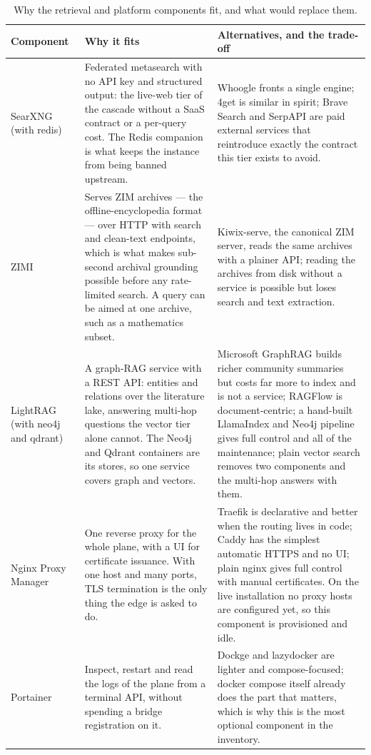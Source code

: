 \documentclass[10pt]{article}
\begin{document}
\begin{table}[htbp]
\centering\footnotesize
\caption{Why the retrieval and platform components fit, and what would replace them.}\label{tab:whyread}
\renewcommand{\arraystretch}{1.15}
\begin{tabularx}{\textwidth}{@{}>{\raggedright\arraybackslash}p{2.8cm} >{\raggedright\arraybackslash}X >{\raggedright\arraybackslash}X@{}}
\toprule
\textbf{Component} & \textbf{Why it fits} & \textbf{Alternatives, and the trade-off} \\
\midrule
SearXNG (with redis) & Federated metasearch with no API key and structured output: the live-web tier of the cascade without a SaaS contract or a per-query cost. The Redis companion is what keeps the instance from being banned upstream. & Whoogle fronts a single engine; 4get is similar in spirit; Brave Search and SerpAPI are paid external services that reintroduce exactly the contract this tier exists to avoid. \\
ZIMI & Serves ZIM archives --- the offline-encyclopedia format --- over HTTP with search and clean-text endpoints, which is what makes sub-second archival grounding possible before any rate-limited search. A query can be aimed at one archive, such as a mathematics subset. & Kiwix-serve, the canonical ZIM server, reads the same archives with a plainer API; reading the archives from disk without a service is possible but loses search and text extraction. \\
LightRAG (with neo4j and qdrant) & A graph-RAG service with a REST API: entities and relations over the literature lake, answering multi-hop questions the vector tier alone cannot. The Neo4j and Qdrant containers are its stores, so one service covers graph and vectors. & Microsoft GraphRAG builds richer community summaries but costs far more to index and is not a service; RAGFlow is document-centric; a hand-built LlamaIndex and Neo4j pipeline gives full control and all of the maintenance; plain vector search removes two components and the multi-hop answers with them. \\
Nginx Proxy Manager & One reverse proxy for the whole plane, with a UI for certificate issuance. With one host and many ports, TLS termination is the only thing the edge is asked to do. & Traefik is declarative and better when the routing lives in code; Caddy has the simplest automatic HTTPS and no UI; plain nginx gives full control with manual certificates. On the live installation no proxy hosts are configured yet, so this component is provisioned and idle. \\
Portainer & Inspect, restart and read the logs of the plane from a terminal API, without spending a bridge registration on it. & Dockge and lazydocker are lighter and compose-focused; docker compose itself already does the part that matters, which is why this is the most optional component in the inventory. \\
\bottomrule
\end{tabularx}
\end{table}
\end{document}
